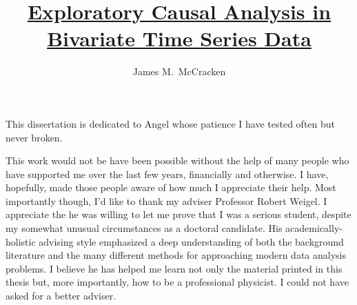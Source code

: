 \documentclass[11pt]{report}
\begin{document}
\title{\underline{Exploratory Causal Analysis in Bivariate Time Series Data}}
\author{James M.\ McCracken}










\signaturepage

\titlepage

\copyrightpage


\dedicationpage

\noindent This dissertation is dedicated to Angel whose patience I have tested often but never broken. 


\acknowledgementspage

\noindent This work would not be have been possible without the help of many people who have supported me over the last few years, financially and otherwise.  I have, hopefully, made those people aware of how much I appreciate their help.  Most importantly though, I'd like to thank my adviser Professor Robert Weigel.  I appreciate the he was willing to let me prove that I was a serious student, despite my somewhat unusual circumstances as a doctoral candidate.  His academically-holistic advising style emphasized a deep understanding of both the background literature and the many different methods for approaching modern data analysis problems.  I believe he has helped me learn not only the material printed in this thesis but, more importantly, how to be a professional physicist.  I could not have asked for a better adviser.  

\tableofcontents

\listoftables

\listoffigures
\end{document}
